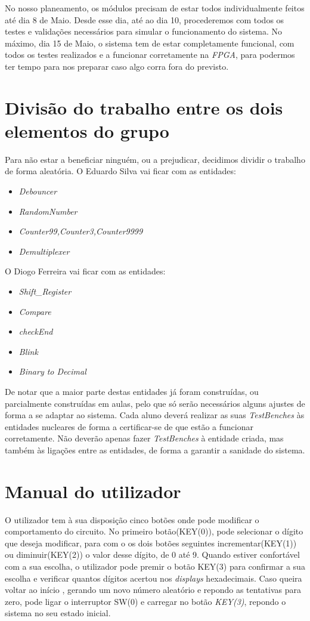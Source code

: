 \documentclass[11pt,openany,twoside]{report}
\begin{document}
No nosso planeamento, os módulos precisam de estar todos individualmente feitos até dia 8 de Maio. Desde esse dia, até ao dia 10, procederemos com todos os testes e validações necessários para simular o funcionamento do sistema. No máximo, dia 15 de Maio, o sistema tem de estar completamente funcional, com todos os testes realizados e a funcionar corretamente na \textit{FPGA}, para podermos ter tempo para nos preparar caso algo corra fora do previsto.

\section{Divisão do trabalho entre os dois elementos do grupo}

Para não estar a beneficiar ninguém, ou a prejudicar, decidimos dividir o trabalho de forma aleatória. O Eduardo Silva vai ficar com as entidades:
\begin{itemize}
\item \textit{Debouncer}
\item \textit{RandomNumber}
\item \textit{Counter99,Counter3,Counter9999}
\item \textit{Demultiplexer}
\end{itemize}

O Diogo Ferreira vai ficar com as entidades:
\begin{itemize}
\item \textit{Shift\_Register}
\item \textit{Compare}
\item \textit{checkEnd}
\item \textit{Blink}
\item \textit{Binary to Decimal}
\end{itemize}

De notar que a maior parte destas entidades já foram construídas, ou parcialmente construídas em aulas, pelo que só serão necessários alguns ajustes de forma a se adaptar ao sistema. Cada aluno deverá realizar as suas \textit{TestBenches} às entidades nucleares de forma a certificar-se de que estão a funcionar corretamente. Não deverão apenas fazer \textit{TestBenches} à entidade criada, mas também às ligações entre as entidades, de forma a garantir a sanidade do sistema.

\section{Manual do utilizador}
O utilizador tem à sua disposição cinco botões onde pode modificar o comportamento do circuito. No primeiro botão(KEY(0)), pode
selecionar o dígito que deseja modificar, para com o os dois botões seguintes incrementar(KEY(1)) ou diminuir(KEY(2)) o valor desse dígito, de 0 até 9. Quando estiver confortável com a sua escolha, o utilizador pode premir o botão KEY(3) para confirmar a sua escolha e verificar quantos dígitos acertou nos \textit{displays} hexadecimais. Caso queira voltar ao início , gerando um novo número aleatório e repondo as tentativas para zero, pode ligar o interruptor SW(0) e carregar no botão \textit{KEY(3)}, repondo o sistema no seu estado inicial.
\end{document}
